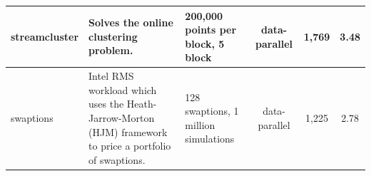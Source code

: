 \begin{table}[!t]
\begin{tabular}{|p{1.3cm}|p{7.4cm}|p{4.5cm}|c|c|c|}
	streamcluster & Solves the online clustering problem. & 200,000 points per block, 5 block & data-parallel & 1,769 & 3.48 \\ \hline
	swaptions & Intel RMS workload which uses the Heath-Jarrow-Morton (HJM) framework to price a portfolio of swaptions. & 128 swaptions, 1 million  simulations & data-parallel & 1,225 & 2.78 \\ \hline
	\end{tabular}
	\label{tab:parsec}
	\vspace{-0.3cm}
\end{table}


% 




